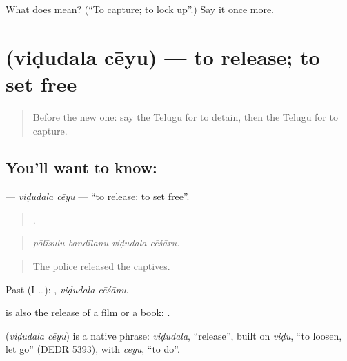 \begin{tcolorbox}[breakable,colback=teal!4,colframe=teal!35!black,title={Before you move on}]
What does  mean? (\textquotedblleft{}To capture; to lock up\textquotedblright{}.) Say it once more.
\end{tcolorbox}
\section[\texorpdfstring{\te{విడుదల} \te{చేయు} (viḍudala cēyu)}{విడుదల చేయు (viḍudala cēyu)}]{  (viḍudala cēyu) — to release; to set free}

\label{lesson:TE-C351-vidudala-ceyu}



\begin{quote}
Before the new one: say the Telugu for to detain, then the Telugu for to capture.
\end{quote}

\subsection*{You'll want to know:  }
\textbf{ } — \emph{viḍudala cēyu} — \textquotedblleft{}to release; to set free\textquotedblright{}.

\begin{quote}
   .
\end{quote}

\begin{quote}
\emph{pōlīsulu bandīlanu viḍudala cēśāru.}
\end{quote}

\begin{quote}
The police released the captives.
\end{quote}

Past (I …):  , \emph{viḍudala cēśānu}.

 is also the release of a film or a book:  .

\begin{cousinweb}
\textbf{ } (\emph{viḍudala cēyu}) is a native phrase: \emph{viḍudala}, \textquotedblleft{}release\textquotedblright{}, built on \emph{viḍu}, \textquotedblleft{}to loosen, let go\textquotedblright{} (DEDR 5393), with \emph{cēyu}, \textquotedblleft{}to do\textquotedblright{}.
\end{cousinweb}

